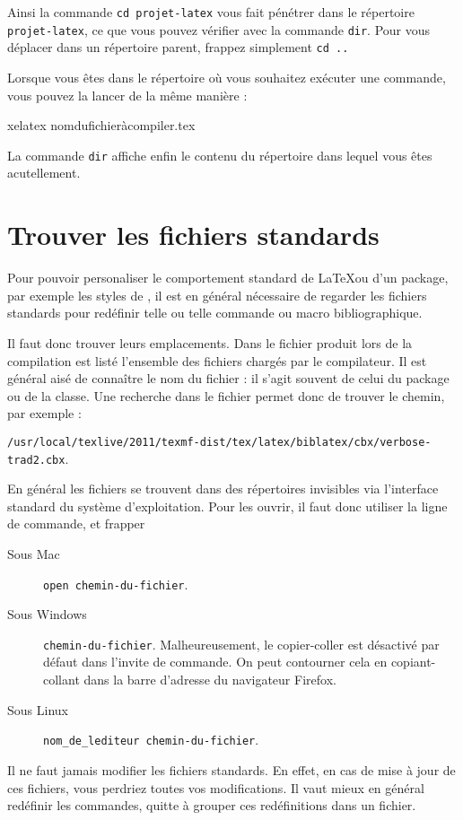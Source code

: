 Ainsi la commande \verb|cd projet-latex| vous fait pénétrer dans le
répertoire \verb|projet-latex|, ce que vous pouvez vérifier avec la
commande \verb|dir|. Pour vous déplacer dans un répertoire parent, frappez
simplement \verb|cd ..|

Lorsque vous êtes dans le répertoire où vous souhaitez exécuter une
commande, vous pouvez la lancer de la même manière :

\begin{bashcode}
xelatex nomdufichieràcompiler.tex
\end{bashcode}

La commande \verb|dir| affiche enfin le contenu du répertoire dans lequel vous êtes acutellement.

\section{Trouver les fichiers standards}\label{trouverfichier}

Pour pouvoir personaliser le comportement standard de \LaTeX ou d'un package, par exemple les styles de , il est en général nécessaire de regarder les fichiers standards pour redéfinir telle ou telle commande ou macro bibliographique. 

Il faut donc trouver leurs emplacements. Dans le fichier  produit lors de la compilation est listé l'ensemble des fichiers chargés par le compilateur. Il est général aisé de connaître le nom du fichier : il s'agit souvent de celui du package ou de la classe. Une recherche dans le fichier permet donc de trouver le chemin, par exemple : 

\verb|/usr/local/texlive/2011/texmf-dist/tex/latex/biblatex/cbx/verbose-trad2.cbx|.

En général les fichiers se trouvent dans des répertoires invisibles via l'interface standard du système d'exploitation. Pour les ouvrir, il faut donc utiliser la ligne de commande, et frapper 
\begin{description}
\item[Sous Mac]\verb|open chemin-du-fichier|.
\item[Sous Windows] \verb|chemin-du-fichier|.  Malheureusement, le copier-coller est désactivé par défaut dans l'invite de commande. On peut contourner cela en copiant-collant dans la barre d'adresse du navigateur Firefox.
\item[Sous Linux] \verb|nom_de_lediteur chemin-du-fichier|.
\end{description}
\begin{attention}
Il ne faut jamais modifier les fichiers standards. En effet, en cas de mise à jour de ces fichiers, vous perdriez toutes vos modifications. Il vaut mieux en général redéfinir les commandes, quitte à grouper ces redéfinitions dans un fichier.
\end{attention}

